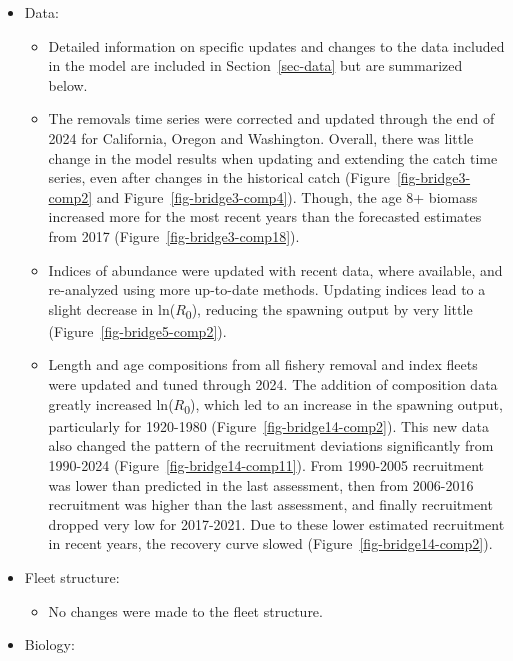 \documentclass[
]{scrartcl}
\providecommand{\tightlist}{%
  \setlength{\itemsep}{0pt}\setlength{\parskip}{0pt}}\usepackage{longtable,booktabs,array}
\begin{document}
\begin{itemize}
\tightlist
\item
  Data:

  \begin{itemize}
  \tightlist
  \item
    Detailed information on specific updates and changes to the data
    included in the model are included in Section~\ref{sec-data} but are
    summarized below.
  \item
    The removals time series were corrected and updated through the end
    of 2024 for California, Oregon and Washington. Overall, there was
    little change in the model results when updating and extending the
    catch time series, even after changes in the historical catch
    (Figure~\ref{fig-bridge3-comp2} and Figure~\ref{fig-bridge3-comp4}).
    Though, the age 8+ biomass increased more for the most recent years
    than the forecasted estimates from 2017
    (Figure~\ref{fig-bridge3-comp18}).\\
  \item
    Indices of abundance were updated with recent data, where available,
    and re-analyzed using more up-to-date methods. Updating indices lead
    to a slight decrease in ln(\(R\)\textsubscript{0}), reducing the
    spawning output by very little (Figure~\ref{fig-bridge5-comp2}).
  \item
    Length and age compositions from all fishery removal and index
    fleets were updated and tuned through 2024. The addition of
    composition data greatly increased ln(\(R\)\textsubscript{0}), which
    led to an increase in the spawning output, particularly for
    1920-1980 (Figure~\ref{fig-bridge14-comp2}). This new data also
    changed the pattern of the recruitment deviations significantly from
    1990-2024 (Figure~\ref{fig-bridge14-comp11}). From 1990-2005
    recruitment was lower than predicted in the last assessment, then
    from 2006-2016 recruitment was higher than the last assessment, and
    finally recruitment dropped very low for 2017-2021. Due to these
    lower estimated recruitment in recent years, the recovery curve
    slowed (Figure~\ref{fig-bridge14-comp2}).
  \end{itemize}
\item
  Fleet structure:

  \begin{itemize}
  \tightlist
  \item
    No changes were made to the fleet structure.
  \end{itemize}
\item
  Biology:


\end{itemize}
\end{document}

